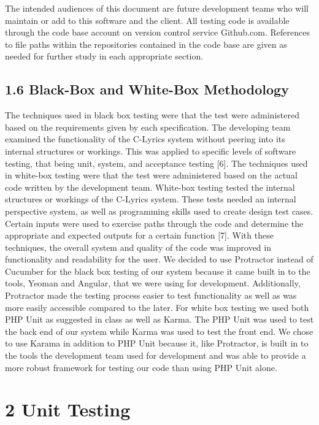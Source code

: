 \documentclass[]{article}
\begin{document}
The intended audiences of this document are future development teams who
will maintain or add to this software and the client. All testing code
is available through the code base account on version control service
Github.com. References to file paths within the repositories contained
in the code base are given as needed for further study in each
appropriate section.

\subsection{\textbf{1.6 Black-Box and White-Box Methodology}}\label{black-box-and-white-box-methodology}

The techniques used in black box testing were that the test were
administered based on the requirements given by each specification. The
developing team examined the functionality of the C-Lyrics system
without peering into its internal structures or workings. This was
applied to specific levels of software testing, that being unit, system,
and acceptance testing {[}6{]}. The techniques used in white-box testing
were that the test were administered based on the actual code written by
the development team. White-box testing tested the internal structures
or workings of the C-Lyrics system. These tests needed an internal
perspective system, as well as programming skills used to create design
test cases. Certain inputs were used to exercise paths through the code
and determine the appropriate and expected outputs for a certain
function {[}7{]}. With these techniques, the overall system and quality
of the code was improved in functionality and readability for the user.
We decided to use Protractor instead of Cucumber for the black box
testing of our system because it came built in to the tools, Yeoman and
Angular, that we were using for development. Additionally, Protractor
made the testing process easier to test functionality as well as was
more easily accessible compared to the later. For white box testing we
used both PHP Unit as suggested in class as well as Karma. The PHP Unit
was used to test the back end of our system while Karma was used to test
the front end. We chose to use Karama in addition to PHP Unit because
it, like Protractor, is built in to the tools the development team used
for development and was able to provide a more robust framework for
testing our code than using PHP Unit alone.

\section{\textbf{2 Unit Testing}}\label{unit-testing}
\end{document}
